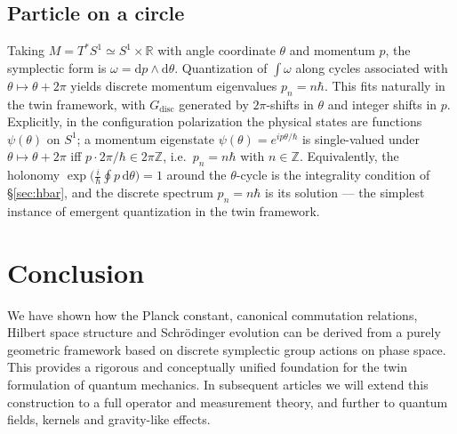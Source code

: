 \documentclass[11pt]{article}
\numberwithin{equation}{section}
\theoremstyle{definition}
\theoremstyle{remark}
\newcommand{\Z}{\mathbb{Z}}
\newcommand{\R}{\mathbb{R}}
\newcommand{\dd}{\mathrm{d}}
\newcommand{\Gdisc}{G_{\mathrm{disc}}}
\begin{document}
	\subsection{Particle on a circle}
	
	Taking $M=T^*S^1\simeq S^1\times\R$ with angle coordinate $\theta$ and
	momentum $p$, the symplectic form is $\omega=\dd p\wedge\dd\theta$.
	Quantization of $\int \omega$ along cycles associated with $\theta
	\mapsto\theta+2\pi$ yields discrete momentum eigenvalues $p_n = n\hbar$.
	This fits naturally in the twin framework, with $\Gdisc$ generated by
	$2\pi$-shifts in $\theta$ and integer shifts in $p$. Explicitly, in the configuration polarization the physical
states are functions $\psi(\theta)$ on $S^1$; a momentum eigenstate $\psi(\theta)=e^{ip\theta/\hbar}$ is
single-valued under $\theta\mapsto\theta+2\pi$ iff $p\cdot 2\pi/\hbar\in 2\pi\Z$, i.e.\ $p_n=n\hbar$ with
$n\in\Z$. Equivalently, the holonomy $\exp\!\big(\tfrac{i}{\hbar}\oint p\,\dd\theta\big)=1$ around the
$\theta$-cycle is the integrality condition of \S\ref{sec:hbar}, and the discrete spectrum $p_n=n\hbar$ is its
solution --- the simplest instance of emergent quantization in the twin framework.
	
	\section*{Conclusion}
	
	We have shown how the Planck constant, canonical commutation relations,
	Hilbert space structure and Schr\"odinger evolution can be derived from
	a purely geometric framework based on discrete symplectic group actions
	on phase space. This provides a rigorous and conceptually unified
	foundation for the twin formulation of quantum mechanics. In subsequent
	articles we will extend this construction to a full operator and
	measurement theory, and further to quantum fields, kernels and
	gravity-like effects.
	
\end{document}
